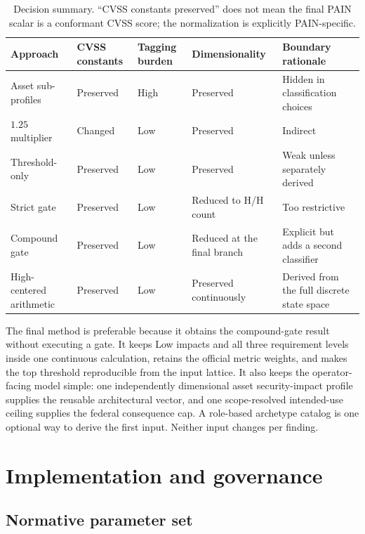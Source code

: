 \documentclass[11pt]{article}
\begin{document}
\begin{table}[H]
\centering
\footnotesize
\renewcommand{\arraystretch}{1.18}
\setlength{\tabcolsep}{5pt}
\begin{tabularx}{\textwidth}{@{}P{0.19\textwidth}YYYY@{}}
\toprule
\textbf{Approach} & \textbf{CVSS constants} & \textbf{Tagging burden} & \textbf{Dimensionality} & \textbf{Boundary rationale} \\
\midrule
Asset sub-profiles & Preserved & High & Preserved & Hidden in classification choices \\
$1.25$ multiplier & Changed & Low & Preserved & Indirect \\
Threshold-only & Preserved & Low & Preserved & Weak unless separately derived \\
Strict gate & Preserved & Low & Reduced to H/H count & Too restrictive \\
Compound gate & Preserved & Low & Reduced at the final branch & Explicit but adds a second classifier \\
High-centered arithmetic & Preserved & Low & Preserved continuously & Derived from the full discrete state space \\
\bottomrule
\end{tabularx}
\caption{Decision summary. ``CVSS constants preserved'' does not mean the final
PAIN scalar is a conformant CVSS score; the normalization is explicitly PAIN-specific.}
\end{table}

The final method is preferable because it obtains the compound-gate result without
executing a gate. It keeps Low impacts and all three requirement levels inside one
continuous calculation, retains the official metric weights, and makes the top
threshold reproducible from the input lattice. It also keeps the operator-facing
model simple: one independently dimensional asset security-impact profile supplies
the reusable architectural vector, and one scope-resolved intended-use ceiling
supplies the federal consequence cap. A role-based archetype catalog is one
optional way to derive the first input. Neither input changes per finding.

\section{Implementation and governance}

\subsection{Normative parameter set}
\end{document}
